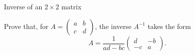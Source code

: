 \documentclass[9pt]{beamer}
\begin{document}

    

\begin{frame}{Inverse of an $2\times 2$ matrix}

    Prove that, for $A = \begin{pmatrix}
            a & b \\
            c & d 
        \end{pmatrix}$, the inverse $A^{-1}$ takes the form
    $$
    A = \frac{1}{ad-bc}
    \begin{pmatrix}
        d & -b \\
        -c & a 
    \end{pmatrix}.
    $$
    
\end{frame}
\end{document}
